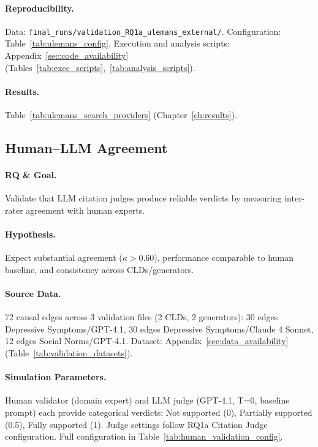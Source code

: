 \paragraph{Reproducibility.}
Data: \texttt{final\_runs/validation\_RQ1a\_ulemans\_external/}. Configuration: Table~\ref{tab:ulemans_config}. Execution and analysis scripts: Appendix~\ref{sec:code_availability} (Tables~\ref{tab:exec_scripts},~\ref{tab:analysis_scripts}).

\paragraph{Results.}
Table~\ref{tab:ulemans_search_providers} (Chapter~\ref{ch:results}).

\subsection{Human--LLM Agreement}
\label{sec:human_llm_agreement}

\paragraph{RQ \& Goal.}
Validate that LLM citation judges produce reliable verdicts by measuring inter-rater agreement with human experts.

\paragraph{Hypothesis.}
Expect substantial agreement ($\kappa > 0.60$), performance comparable to human baseline, and consistency across CLDs/generators.

\paragraph{Source Data.}
72 causal edges across 3 validation files (2 CLDs, 2 generators): 30 edges Depressive Symptoms/GPT-4.1, 30 edges Depressive Symptoms/Claude 4 Sonnet, 12 edges Social Norms/GPT-4.1. Dataset: Appendix~\ref{sec:data_availability} (Table~\ref{tab:validation_datasets}).

\paragraph{Simulation Parameters.}
Human validator (domain expert) and LLM judge (GPT-4.1, T=0, baseline prompt) each provide categorical verdicts: Not supported (0), Partially supported (0.5), Fully supported (1). Judge settings follow RQ1a Citation Judge configuration. Full configuration in Table~\ref{tab:human_validation_config}.

